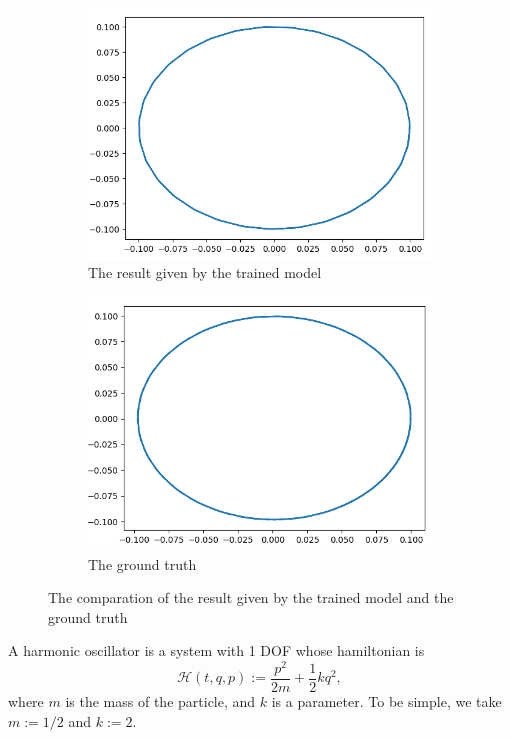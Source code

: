 \documentclass{article}
\begin{document}
\begin{figure}[h]
	\centering
	\begin{subfigure}[b]{0.45\linewidth}
		\includegraphics[width=\linewidth]{spring_learned.png}
		\caption{The result given by the trained model}
	\end{subfigure}
	\begin{subfigure}[b]{0.45\linewidth}
		\includegraphics[width=\linewidth]{spring_truth.png}
		\caption{The ground truth}
	\end{subfigure}
	\caption{The comparation of the result given by the trained model and the ground truth}
	\label{fig:spring_comp}
\end{figure}

A harmonic oscillator is a system with 1 DOF whose hamiltonian is \cite[p. 157]{landau1976mechanics}
\begin{equation*}
	\mathcal H\left(t,q,p\right):=\frac{p^2}{2m}+\frac12kq^2,
\end{equation*}
where $m$ is the mass of the particle, and $k$ is a parameter.
To be simple, we take $m:=1/2$ and $k:=2$.
\end{document}
